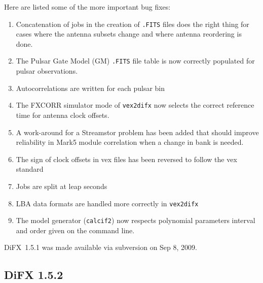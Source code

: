 Here are listed some of the more important bug fixes:
\begin{enumerate}
\item Concatenation of jobs in the creation of {\tt .FITS} files does the right thing for cases where the antenna subsets change and where antenna reordering is done.
\item The Pulsar Gate Model (GM) {\tt .FITS} file table is now correctly populated for pulsar observations.
\item Autocorrelations are written for each pulsar bin
\item The FXCORR simulator mode of {\tt vex2difx} now selects the correct reference time for antenna clock offsets.
\item A work-around for a Streamstor problem has been added that should improve reliability in Mark5 module correlation when a change in bank is needed.
\item The sign of clock offsets in vex files has been reversed to follow the vex standard
\item Jobs are split at leap seconds
\item LBA data formats are handled more correctly in {\tt vex2difx}
\item The model generator ({\tt calcif2}) now respects polynomial parameters interval and order given on the command line.
\end{enumerate}

DiFX~1.5.1 was made available via subversion on Sep 8, 2009.

\subsection{DiFX 1.5.2}

